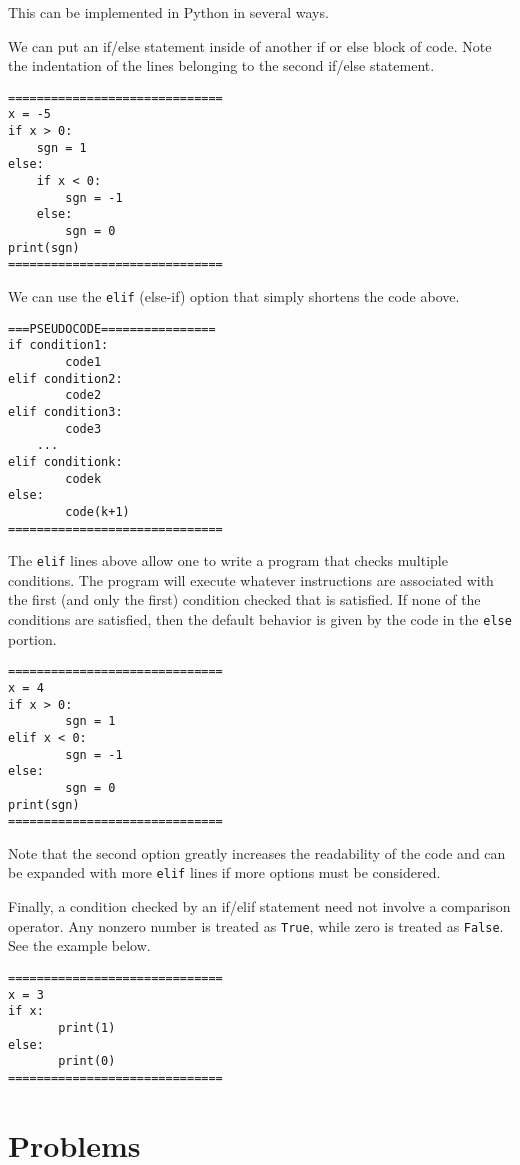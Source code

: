 \documentclass{ximera}
\begin{document}
This can be implemented in Python in several ways.

We can put an if/else statement inside of another if or else block of code. Note the indentation of the lines belonging to the second if/else statement.

\begin{verbatim}
==============================
x = -5
if x > 0:
	sgn = 1
else:
	if x < 0:
		sgn = -1
	else:
		sgn = 0
print(sgn)
==============================
\end{verbatim}
	
We can use the \verb|elif| (else-if) option that simply shortens the code above.

\begin{verbatim}
===PSEUDOCODE================
if condition1:
        code1
elif condition2:
        code2
elif condition3:
        code3
    ...
elif conditionk:
        codek
else:
        code(k+1)
==============================
\end{verbatim}

The \verb|elif| lines above allow one to write a program that checks multiple conditions. The program will execute whatever instructions are associated with the first (and only the first) condition checked that is satisfied. If none of the conditions are satisfied, then the default behavior is given by the code in the \verb|else| portion.

\begin{verbatim}
==============================
x = 4
if x > 0:
        sgn = 1
elif x < 0:
        sgn = -1
else:
        sgn = 0
print(sgn)
==============================
\end{verbatim}

Note that the second option greatly increases the readability of the code and can be expanded with more \verb|elif| lines if more options must be considered.

Finally, a condition checked by an if/elif statement need not involve a comparison operator. Any nonzero number is treated as \verb|True|, while zero is treated as \verb|False|. See the example below.

\begin{verbatim}
==============================
x = 3
if x:
       print(1)
else:
       print(0)
==============================
\end{verbatim}

\section{Problems}
\end{document}
